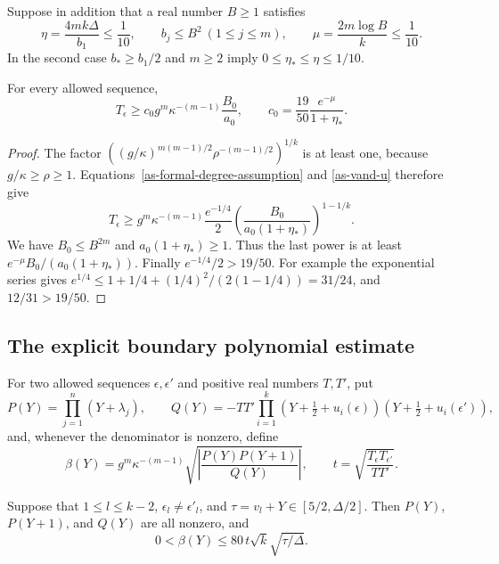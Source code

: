 Suppose in addition that a real number $B\geq1$ satisfies
\begin{equation}\label{as-small-parameters}
 \eta=\frac{4mk\Delta}{b_1}\leq\frac1{10},\qquad
 b_j\leq B^2\ (1\leq j\leq m),\qquad
 \mu=\frac{2m\log B}{k}\leq\frac1{10}.
\end{equation}
In the second case $b_*\geq b_1/2$ and $m\geq2$ imply
$0\leq\eta_*\leq\eta\leq1/10$.

\begin{proposition}\label{as-critical-lower}
For every allowed sequence,
\begin{equation}\label{as-critical-lower-eq}
 T_\epsilon\geq
 c_0 g^m\kappa^{-(m-1)}\frac{B_0}{a_0},
 \qquad
 c_0=\frac{19}{50}\frac{e^{-\mu}}{1+\eta_*}.
\end{equation}
\end{proposition}

\begin{proof}
The factor
$((g/\kappa)^{m(m-1)/2}\rho^{-(m-1)/2})^{1/k}$
is at least one, because $g/\kappa\geq\rho\geq1$.
Equations~\eqref{as-formal-degree-assumption} and
\eqref{as-vand-u} therefore give
\[
 T_\epsilon\geq g^m\kappa^{-(m-1)}
       \frac{e^{-1/4}}2
       \left(\frac{B_0}{a_0(1+\eta_*)}\right)^{1-1/k}.
\]
We have $B_0\leq B^{2m}$ and $a_0(1+\eta_*)\geq1$.
Thus the last power is at least
$e^{-\mu}B_0/(a_0(1+\eta_*))$.
Finally $e^{-1/4}/2>19/50$.
For example the exponential series gives
$e^{1/4}\leq1+1/4+(1/4)^2/(2(1-1/4))=31/24$,
and $12/31>19/50$.
\end{proof}

\subsection{The explicit boundary polynomial estimate}

For two allowed sequences $\epsilon,\epsilon'$ and positive
real numbers $T,T'$, put
\[
 P(Y)=\prod_{j=1}^n(Y+\lambda_j),\qquad
 Q(Y)=-TT'\prod_{i=1}^k
          (Y+\tfrac12+u_i(\epsilon))
          (Y+\tfrac12+u_i(\epsilon')),
\]
and, whenever the denominator is nonzero, define
\[
 \beta(Y)=g^m\kappa^{-(m-1)}
             \sqrt{\left|\frac{P(Y)P(Y+1)}{Q(Y)}\right|},
 \qquad t=\sqrt{\frac{T_\epsilon T_{\epsilon'}}{TT'}}.
\]

\begin{theorem}\label{as-boundary}
Suppose that $1\leq l\leq k-2$,
$\epsilon_l\ne\epsilon'_l$, and
$\tau=v_l+Y\in[5/2,\Delta/2]$.
Then $P(Y)$, $P(Y+1)$, and $Q(Y)$ are all nonzero, and
\begin{equation}\label{as-boundary-eq}
 0<\beta(Y)\leq80\,t\sqrt{k}\sqrt{\tau/\Delta}.
\end{equation}
\end{theorem}

